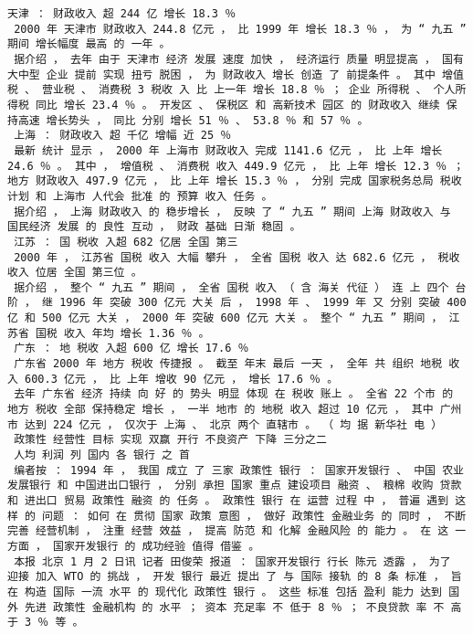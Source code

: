 \documentclass{article}
\begin{document}
\begin{Verbatim}[commandchars=\\\{\}]
 天津 ： 财政收入 超 244 亿 增长 18.3 ％ 
 2000 年 天津市 财政收入 244.8 亿元 ， 比 1999 年 增长 18.3 ％ ， 为 “ 九五 ” 期间 增长幅度 最高 的 一年 。 
 据介绍 ， 去年 由于 天津市 经济 发展 速度 加快 ， 经济运行 质量 明显提高 ， 国有 大中型 企业 提前 实现 扭亏 脱困 ， 为 财政收入 增长 创造 了 前提条件 。 其中 增值税 、 营业税 、 消费税 3 税收 入 比 上一年 增长 18.8 ％ ； 企业 所得税 、 个人所得税 同比 增长 23.4 ％ 。 开发区 、 保税区 和 高新技术 园区 的 财政收入 继续 保持高速 增长势头 ， 同比 分别 增长 51 ％ 、 53.8 ％ 和 57 ％ 。 
 上海 ： 财政收入 超 千亿 增幅 近 25 ％ 
 最新 统计 显示 ， 2000 年 上海市 财政收入 完成 1141.6 亿元 ， 比 上年 增长 24.6 ％ 。 其中 ， 增值税 、 消费税 收入 449.9 亿元 ， 比 上年 增长 12.3 ％ ； 地方 财政收入 497.9 亿元 ， 比 上年 增长 15.3 ％ ， 分别 完成 国家税务总局 税收 计划 和 上海市 人代会 批准 的 预算 收入 任务 。 
 据介绍 ， 上海 财政收入 的 稳步增长 ， 反映 了 “ 九五 ” 期间 上海 财政收入 与 国民经济 发展 的 良性 互动 ， 财政 基础 日渐 稳固 。 
 江苏 ： 国 税收 入超 682 亿居 全国 第三 
 2000 年 ， 江苏省 国税 收入 大幅 攀升 ， 全省 国税 收入 达 682.6 亿元 ， 税收收入 位居 全国 第三位 。 
 据介绍 ， 整个 “ 九五 ” 期间 ， 全省 国税 收入 （ 含 海关 代征 ） 连 上 四个 台阶 ， 继 1996 年 突破 300 亿元 大关 后 ， 1998 年 、 1999 年 又 分别 突破 400 亿 和 500 亿元 大关 ， 2000 年 突破 600 亿元 大关 。 整个 “ 九五 ” 期间 ， 江苏省 国税 收入 年均 增长 1.36 ％ 。 
 广东 ： 地 税收 入超 600 亿 增长 17.6 ％ 
 广东省 2000 年 地方 税收 传捷报 。 截至 年末 最后 一天 ， 全年 共 组织 地税 收入 600.3 亿元 ， 比 上年 增收 90 亿元 ， 增长 17.6 ％ 。 
 去年 广东省 经济 持续 向 好 的 势头 明显 体现 在 税收 账上 。 全省 22 个市 的 地方 税收 全部 保持稳定 增长 ， 一半 地市 的 地税 收入 超过 10 亿元 ， 其中 广州市 达到 224 亿元 ， 仅次于 上海 、 北京 两个 直辖市 。 （ 均 据 新华社 电 ） 
 政策性 经营性 目标 实现 双赢 开行 不良资产 下降 三分之二 
 人均 利润 列 国内 各 银行 之 首 
 编者按 ： 1994 年 ， 我国 成立 了 三家 政策性 银行 ： 国家开发银行 、 中国 农业发展银行 和 中国进出口银行 ， 分别 承担 国家 重点 建设项目 融资 、 粮棉 收购 贷款 和 进出口 贸易 政策性 融资 的 任务 。 政策性 银行 在 运营 过程 中 ， 普遍 遇到 这样 的 问题 ： 如何 在 贯彻 国家 政策 意图 ， 做好 政策性 金融业务 的 同时 ， 不断完善 经营机制 ， 注重 经营 效益 ， 提高 防范 和 化解 金融风险 的 能力 。 在 这 一方面 ， 国家开发银行 的 成功经验 值得 借鉴 。 
 本报 北京 1 月 2 日讯 记者 田俊荣 报道 ： 国家开发银行 行长 陈元 透露 ， 为了 迎接 加入 WTO 的 挑战 ， 开发 银行 最近 提出 了 与 国际 接轨 的 8 条 标准 ， 旨在 构造 国际 一流 水平 的 现代化 政策性 银行 。 这些 标准 包括 盈利 能力 达到 国外 先进 政策性 金融机构 的 水平 ； 资本 充足率 不 低于 8 ％ ； 不良贷款 率 不 高于 3 ％ 等 。 

\end{Verbatim}
\end{document}
